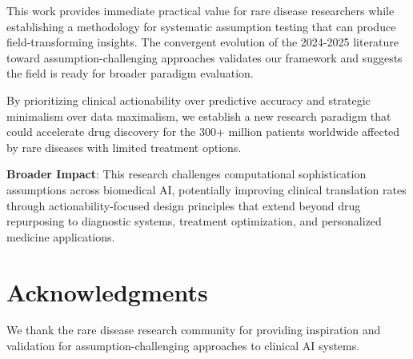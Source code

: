 \documentclass{article}
\begin{document}
This work provides immediate practical value for rare disease researchers while establishing a methodology for systematic assumption testing that can produce field-transforming insights. The convergent evolution of the 2024-2025 literature toward assumption-challenging approaches validates our framework and suggests the field is ready for broader paradigm evaluation.

By prioritizing clinical actionability over predictive accuracy and strategic minimalism over data maximalism, we establish a new research paradigm that could accelerate drug discovery for the 300+ million patients worldwide affected by rare diseases with limited treatment options.

\textbf{Broader Impact}: This research challenges computational sophistication assumptions across biomedical AI, potentially improving clinical translation rates through actionability-focused design principles that extend beyond drug repurposing to diagnostic systems, treatment optimization, and personalized medicine applications.

\section*{Acknowledgments}
We thank the rare disease research community for providing inspiration and validation for assumption-challenging approaches to clinical AI systems.
\end{document}
